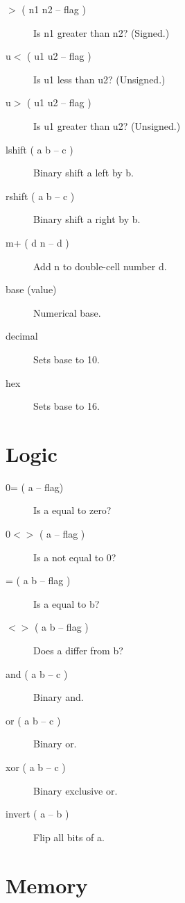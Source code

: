 \begin{description}
\item[$>$ ( n1 n2 -- flag )] Is n1 greater than n2? (Signed.)
\item[u$<$ ( u1 u2 -- flag )] Is u1 less than u2? (Unsigned.)
\item[u$>$ ( u1 u2 -- flag )] Is u1 greater than u2? (Unsigned.)
\item[lshift ( a b -- c )] Binary shift a left by b.
\item[rshift ( a b -- c )] Binary shift a right by b.
\item[m+ ( d n -- d )] Add n to double-cell number d.
\item[base (value)] Numerical base.
\item[decimal] Sets base to 10.
\item[hex] Sets base to 16.

\end{description}

\section{Logic}

\begin{description}
\item[0= ( a -- flag)] Is a equal to zero?
\item[0$<>$ ( a -- flag )] Is a not equal to 0?
\item[= ( a b -- flag )] Is a equal to b?
\item[$<>$ ( a b -- flag )] Does a differ from b?
\item[and ( a b -- c )] Binary and.  
\item[or ( a b -- c )] Binary or.  
\item[xor ( a b -- c )] Binary exclusive or.  
\item[invert ( a -- b )] Flip all bits of a.  
\end{description}

\section{Memory}

